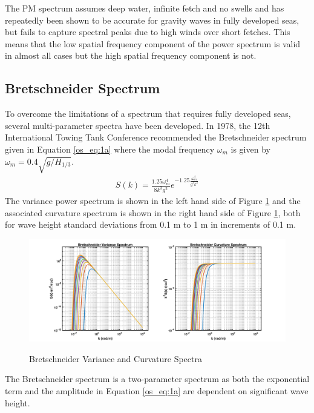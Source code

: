 The PM spectrum assumes deep water, infinite fetch and no swells and has repeatedly been shown to be accurate for gravity waves in fully developed seas, but fails to capture spectral peaks due to high winds over short fetches. This means that the low spatial frequency component of the power spectrum is valid in almost all cases but the high spatial frequency component is not.

\subsection{Bretschneider Spectrum}
To overcome the limitations of a spectrum that requires fully developed seas, several multi-parameter spectra have been developed. In 1978, the 12th International Towing Tank Conference recommended the Bretschneider spectrum \cite{michel_sea_spectra} given in Equation \ref{os_eq:1a} where the modal frequency $\omega_m$ is given by $\omega_m = 0.4\sqrt{g/H_{1/3}}$.
\begin{equation}
  \begin{gathered}
  \label{os_eq:1a}
  S(k) = \frac{1.25 \omega_m^4}{8k^3g^2}e^{-1.25\frac{\omega_m^4}{g^2k^2}} 
  \end{gathered}
\end{equation}
\renewcommand{\baselinestretch}{2} \small\normalsize
The variance power spectrum is shown in the left hand side of Figure \ref{os_fig:1a} and the associated curvature spectrum is shown in the right hand side of Figure \ref{os_fig:1a}, both for wave height standard deviations from 0.1 m to 1 m in increments of 0.1 m.

 \begin{figure}[H]
  \begin{center}
\includegraphics[width=6in]{../media/Ocean_Surface/bs_variance_curvature_spectrum.png}
  \end{center}
  \renewcommand{\baselinestretch}{1} \small\normalsize
  \begin{quote}
    \caption[Bretschneider Variance and Curvature Spectra]{Bretschneider Variance and Curvature Spectra\label{os_fig:1a}}
  \end{quote}
\end{figure}
 \renewcommand{\baselinestretch}{2} \small\normalsize
The Bretschneider spectrum is a two-parameter spectrum as both the exponential term and the amplitude in Equation \ref{os_eq:1a} are dependent on significant wave height.

